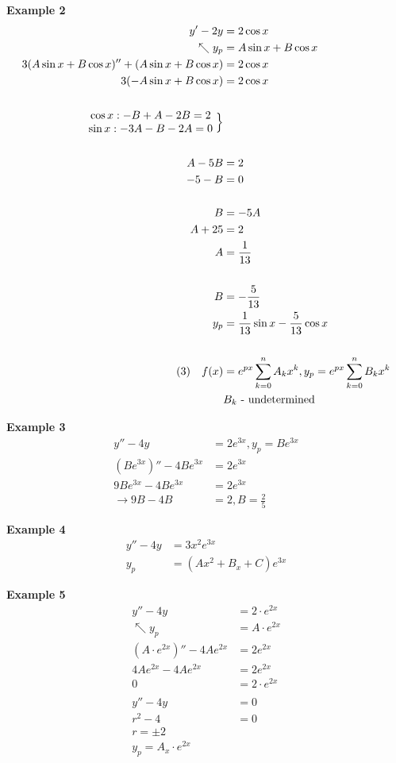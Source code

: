 \documentclass[10pt, letterpaper]{article}
\begin{document}
\textbf{Example 2}
\begin{align*}
y'-2y &= 2 \cos x\\
\nwarrow y_p &= A\sin x +B\cos x\\
3(A\sin x+B\cos x)''+(A\sin x+B\cos x) &= 2\cos x\\
3(-A\sin x+B\cos x) &= 2\cos x\\
\\
\begin{matrix}
\cos x: -B+A-2B=2\\
\sin x: -3A-B-2A=0
\end{matrix}
\Bigm\}\\
\\
A-5B &= 2\\
-5-B &= 0\\
\\
B &= -5A\\
A+25 &= 2\\
A &= \frac{1}{13}\\
\\
B &= -\frac{5}{13}\\
y_p &= \frac{1}{13}\sin x - \frac{5}{13}\cos x\\
\\
(3) ~~~ f(x) &= e^{px}\sum_{k=0}^{n} A_kx^k, y_p=e^{px}\sum_{k=0}^{n} B_kx^k\\
&B_k\text{ - undetermined}
\end{align*}

\textbf{Example 3}
\begin{align*}
y''-4y &= 2e^{3x}, y_p=Be^{3x}\\
(Be^{3x})''-4Be^{3x} &= 2e^{3x}\\
9Be^{3x}-4Be^{3x} &= 2e^{3x}\\
\rightarrow 9B-4B &= 2, B=\frac{2}{5}
\end{align*}

\textbf{Example 4}
\begin{align*}
y''-4y &= 3x^2e^{3x}\\
y_p &= (Ax^2+B_x+C)e^{3x}
\end{align*}

\textbf{Example 5}
\begin{align*}
y''-4y &= 2\cdot e^{2x}\\
\nwarrow y_p &= A \cdot e^{2x}\\
(A \cdot e^{2x})''-4Ae^{2x} &= 2e^{2x}\\
4Ae^{2x}-4Ae^{2x} &= 2e^{2x}\\
0 &= 2\cdot e^{2x}\\
\\
y''-4y &= 0\\
r^2-4 &= 0\\
r = \pm 2\\
y_p = A_x \cdot e^{2x}
\end{align*}
\end{document}
